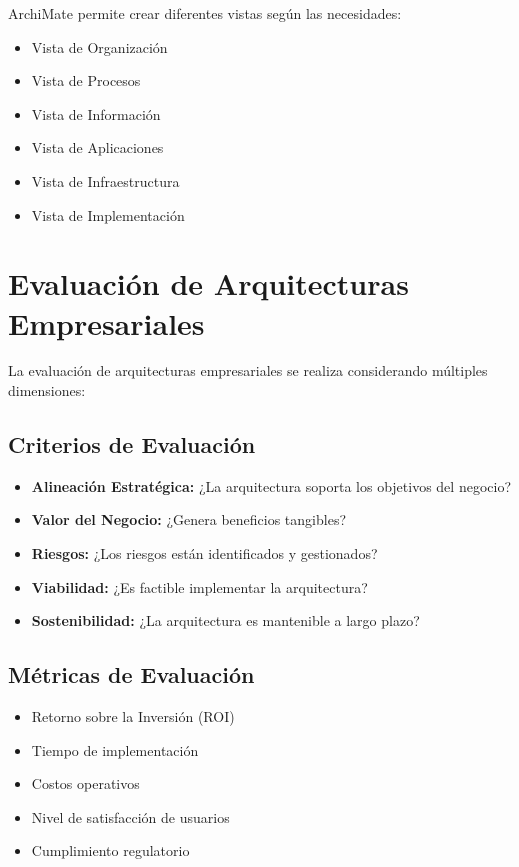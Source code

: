 ArchiMate permite crear diferentes vistas según las necesidades:
\begin{itemize}
\item Vista de Organización
\item Vista de Procesos
\item Vista de Información
\item Vista de Aplicaciones
\item Vista de Infraestructura
\item Vista de Implementación
\end{itemize}

\section{Evaluación de Arquitecturas Empresariales}

La evaluación de arquitecturas empresariales se realiza considerando múltiples dimensiones:

\subsection{Criterios de Evaluación}
\begin{itemize}
\item \textbf{Alineación Estratégica:} ¿La arquitectura soporta los objetivos del negocio?
\item \textbf{Valor del Negocio:} ¿Genera beneficios tangibles?
\item \textbf{Riesgos:} ¿Los riesgos están identificados y gestionados?
\item \textbf{Viabilidad:} ¿Es factible implementar la arquitectura?
\item \textbf{Sostenibilidad:} ¿La arquitectura es mantenible a largo plazo?
\end{itemize}

\subsection{Métricas de Evaluación}
\begin{itemize}
\item Retorno sobre la Inversión (ROI)
\item Tiempo de implementación
\item Costos operativos
\item Nivel de satisfacción de usuarios
\item Cumplimiento regulatorio
\end{itemize}

